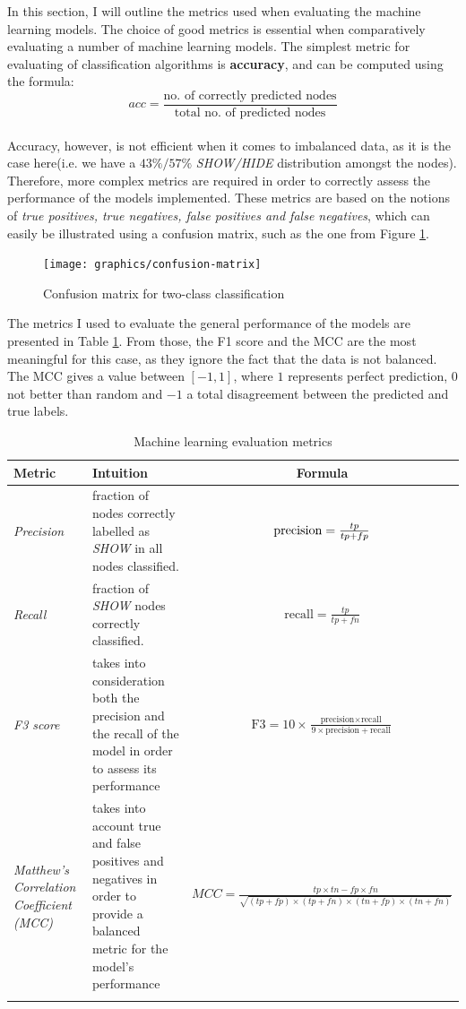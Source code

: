		In this section, I will outline the metrics used when evaluating the machine learning models. The choice of good metrics is essential when comparatively evaluating a number of machine learning models. The simplest metric for evaluating of classification algorithms is \textbf{accuracy}, and can be computed using the formula: 
		\\
		\begin{equation}
			acc = \frac{\text{no. of correctly predicted nodes}}{\text{total no. of predicted nodes}}
		\end{equation}
		\\
		Accuracy, however, is not efficient when it comes to imbalanced data, as it is the case here(i.e. we have a $43\%/57\%$ \textit{SHOW/HIDE} distribution amongst the nodes). Therefore, more complex metrics are required in order to correctly assess the performance of the models implemented. These metrics are based on the notions of \textit{true positives, true negatives, false positives and false negatives}, which can easily be illustrated using a confusion matrix, such as the one from Figure \ref{Fig: eval/ml/metrics/confusion-matrix}.
		\begin{figure}[H]
			\centering
			\texttt{[image: graphics/confusion-matrix]}
			\caption{Confusion matrix for two-class classification}
			\label{Fig: eval/ml/metrics/confusion-matrix}
		\end{figure}
		The metrics I used to evaluate the general performance of the models are presented in Table \ref{Table: eval/ml/metrics/metrics}. From those, the F1 score and the MCC are the most meaningful for this case, as they ignore the fact that the data is not balanced. The MCC gives a value between $[-1, 1]$, where $1$ represents perfect prediction, $0$ not better than random and $-1$ a total disagreement between the predicted and true labels.
		\begin{longtable}{|p{}|p{}|c|}
		   \textbf{Metric} & \textbf{Intuition} &\textbf{Formula} \\
			\hline
			\textit{Precision} & fraction of nodes correctly labelled as \textit{SHOW} in all nodes classified. & {$\centering \text{precision} = \frac{tp}{tp+fp}$} \\
			\hline 
			\textit{Recall} & fraction of \textit{SHOW} nodes correctly classified. & $\text{recall} = \frac{tp}{tp+fn}$ \\
			\hline
			\textit{F3 score} & takes into consideration both the precision and the recall of the model in order to assess its performance & $\text{F3} = 10\times\frac{\text{precision}\times\text{recall}}{9\times\text{precision} + \text{recall}}$\\
			\hline 
			\textit{Matthew's Correlation Coefficient (MCC)} & takes into account true and false positives and negatives in order to provide a balanced metric for the model's performance & $MCC = \frac{tp\times tn - fp\times fn}{\sqrt{(tp+fp)\times(tp+fn)\times(tn+fp)\times(tn+fn)}}$\\
			\hline
			\caption{Machine learning evaluation metrics}
			\label{Table: eval/ml/metrics/metrics}
		\end{longtable}
		
